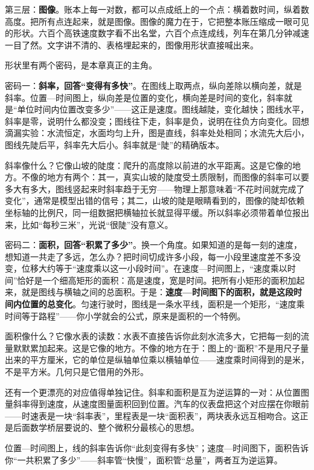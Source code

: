 第三层：\textbf{图像}。账本上每一对数，都可以点成纸上的一个点：横着数时间，纵着数高度。把所有点连起来，就是图像。图像的魔力在于，它把整本账压缩成一眼可见的形状。六百个高铁速度数字看不出名堂，六百个点连成线，列车在第几分钟减速一目了然。文字讲不清的、表格埋起来的，图像用形状直接喊出来。

形状里有两个密码，是本章真正的主角。

密码一：\textbf{斜率，回答“变得有多快”}。在图线上取两点，纵向差除以横向差，就是斜率。位置—时间图上，纵向差是位置的变化，横向差是时间的变化，斜率就是“单位时间内位置改变多少”——这正是速度。图线越陡，变化越快；图线水平，斜率是零，说明什么都没变；图线往下走，斜率是负，说明在往负方向变化。回想滴漏实验：水流恒定，水面均匀上升，图是直线，斜率处处相同；水流先大后小，图线先陡后平，斜率先大后小。斜率就是“陡”的精确版本。

斜率像什么？它像山坡的陡度：爬升的高度除以前进的水平距离。这是它像的地方。不像的地方有两个：其一，真实山坡的陡度受土质限制，而图像的斜率可以要多大有多大，图线竖起来时斜率趋于无穷——物理上那意味着“不花时间就完成了变化”，通常是模型出错的信号；其二，山坡的陡是眼睛看到的，图像的陡却依赖坐标轴的比例尺，同一组数据把横轴拉长就显得平缓。所以斜率必须带着单位报出来，比如“每秒三米”，光说“很陡”没有意义。

密码二：\textbf{面积，回答“积累了多少”}。换一个角度。如果知道的是每一刻的速度，想知道一共走了多远，怎么办？把时间切成许多小段，每一小段里速度差不多没变，位移大约等于“速度乘以这一小段时间”。在速度—时间图上，“速度乘以时间”恰好是一个细高矩形的面积：高是速度，宽是时间。把所有小矩形的面积加起来，就是图线与横轴之间的总面积。于是：\textbf{速度—时间图下的面积，就是这段时间内位置的总变化}。匀速行驶时，图线是一条水平线，面积是一个矩形，“速度乘时间等于路程”——你小学就会的公式，原来是面积的一个特例。

面积像什么？它像水表的读数：水表不直接告诉你此刻水流多大，它把每一刻的流量默默累加起来。这是它像的地方。不像的地方在于：图上的“面积”不是用尺子量出来的平方厘米，它的单位是纵轴单位乘以横轴单位——速度乘时间得到的是米，不是平方米。几何只是它借用的外形。

还有一个更漂亮的对应值得单独记住。斜率和面积是互为逆运算的一对：从位置图量斜率得到速度，从速度图量面积回到位置。汽车的仪表盘把这个对应摆在你眼前——时速表是一块“斜率表”，里程表是一块“面积表”，两块表永远互相吻合。这正是后面数学桥层要说的、整个微积分最核心的思想。


\begin{oneline}
位置—时间图上，线的斜率告诉你“此刻变得有多快”；速度—时间图下，面积告诉你“一共积累了多少”——斜率管“快慢”，面积管“总量”，两者互为逆运算。
\end{oneline}

